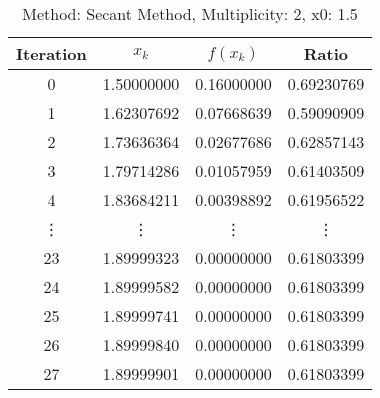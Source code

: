 \begin{table}
\centering
\caption{Method: Secant Method, Multiplicity: 2, x0: 1.5}
\label{tab:table_Secant_Method_2_1_5}
\begin{tabular}{c c c c}
\toprule
Iteration &      $x_k$ &   $f(x_k)$ &      Ratio \\
\midrule
        0 & 1.50000000 & 0.16000000 & 0.69230769 \\
        1 & 1.62307692 & 0.07668639 & 0.59090909 \\
        2 & 1.73636364 & 0.02677686 & 0.62857143 \\
        3 & 1.79714286 & 0.01057959 & 0.61403509 \\
        4 & 1.83684211 & 0.00398892 & 0.61956522 \\
   \vdots &     \vdots &     \vdots &     \vdots \\
       23 & 1.89999323 & 0.00000000 & 0.61803399 \\
       24 & 1.89999582 & 0.00000000 & 0.61803399 \\
       25 & 1.89999741 & 0.00000000 & 0.61803399 \\
       26 & 1.89999840 & 0.00000000 & 0.61803399 \\
       27 & 1.89999901 & 0.00000000 & 0.61803399 \\
\bottomrule
\end{tabular}
\end{table}
